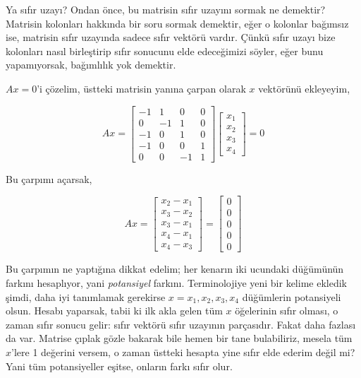 \documentclass[12pt,fleqn]{article}\usepackage{../../common}
\begin{document}
Ya sıfır uzayı? Ondan önce, bu matrisin sıfır uzayını sormak ne demektir?
Matrisin kolonları hakkında bir soru sormak demektir, eğer o kolonlar
bağımsız ise, matrisin sıfır uzayında sadece sıfır vektörü vardır. Çünkü
sıfır uzayı bize kolonları nasıl birleştirip sıfır sonucunu elde
edeceğimizi söyler, eğer bunu yapamıyorsak, bağımlılık yok demektir. 

$Ax=0$'i çözelim, üstteki matrisin yanına çarpan olarak $x$ vektörünü
ekleyeyim,

$$ Ax = 
\left[\begin{array}{rrrr}
-1 & 1 & 0 & 0 \\
0 & -1 & 1  & 0 \\
-1  & 0  & 1  & 0 \\
-1 & 0 & 0 & 1 \\
0 & 0 & -1 & 1
\end{array}\right]
\left[\begin{array}{r}
x_1 \\ x_2 \\ x_3 \\ x_4
\end{array}\right]
= 0
 $$

Bu çarpımı açarsak, 

$$ 
Ax = 
\left[\begin{array}{r}
x_2 - x_1 \\
x_3 - x_2 \\
x_3 - x_1 \\
x_4 - x_1 \\
x_4 - x_3 
\end{array}\right] =
\left[\begin{array}{r}
0 \\ 0 \\ 0 \\ 0 \\ 0
\end{array}\right]
$$

Bu çarpımın ne yaptığına dikkat edelim; her kenarın iki ucundaki düğümünün
farkını hesaplıyor, yani {\em potansiyel} farkını. Terminolojiye yeni bir
kelime ekledik şimdi, daha iyi tanımlamak gerekirse $x=x_1,x_2,x_3,x_4$
düğümlerin potansiyeli olsun. Hesabı yaparsak, tabii ki ilk akla gelen tüm
$x$ öğelerinin sıfır olması, o zaman sıfır sonucu gelir: sıfır vektörü
sıfır uzayının parçasıdır. Fakat daha fazlası da var. Matrise çıplak gözle
bakarak bile hemen bir tane bulabiliriz, mesela tüm $x$'lere 1 değerini
versem, o zaman üstteki hesapta yine sıfır elde ederim değil mi?  Yani tüm
potansiyeller eşitse, onların farkı sıfır olur.
\end{document}
